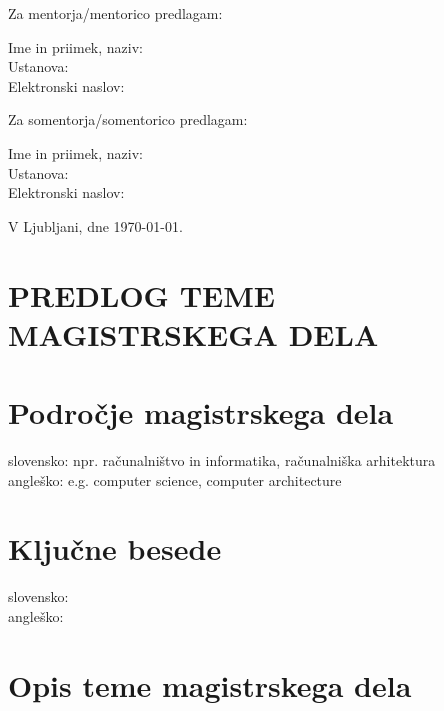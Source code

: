 \documentclass[a4paper, 12pt]{article}
\begin{document}
Za mentorja/mentorico predlagam:

\hfill\begin{minipage}{\dimexpr\textwidth-2cm}
Ime in priimek, naziv: \\
Ustanova: \\
Elektronski naslov:
\end{minipage}

Za somentorja/somentorico predlagam:

\hfill\begin{minipage}{\dimexpr\textwidth-2cm}
Ime in priimek, naziv: \\
Ustanova: \\
Elektronski naslov: \\
\end{minipage}




\bigskip


\hfill V Ljubljani, dne \today.
%




\clearpage
\section*{PREDLOG TEME MAGISTRSKEGA DELA}

\section{Področje magistrskega dela}

slovensko: npr. računalništvo in informatika, računalniška arhitektura\\
angleško: e.g. computer science, computer architecture


\section{Ključne besede}

slovensko:    \\
angleško:


\section{Opis teme magistrskega dela}
\end{document}
